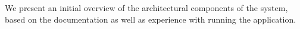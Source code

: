We present an initial overview of the architectural components of the system, based on the documentation as well as experience with running the application.

